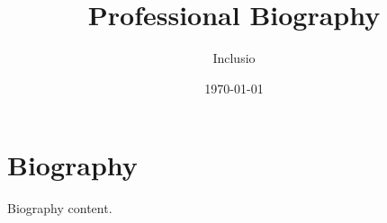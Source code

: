 \documentclass[final,tagged]{pub-bio}
\title{Professional Biography}
\author{Inclusio}
\date{\today}
\begin{document}
\maketitle

\section{Biography}
Biography content.
\end{document}
